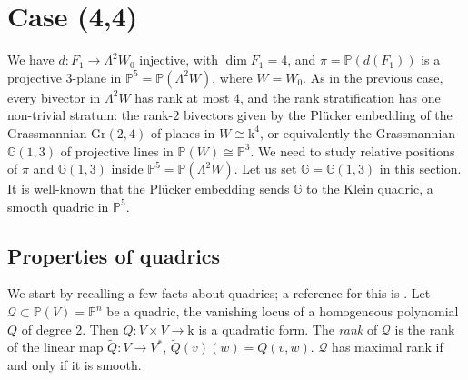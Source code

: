 \documentclass[10pt,reqno]{amsart}
\newcommand{\cQ}{\mathcal{Q}}
\newcommand{\GG}{\mathbb{G}}
\newcommand{\PP}{\mathbb P}
\renewcommand{\L}{\Lambda}
\newcommand{\kk}{\mathrm{k}}
\newcommand{\tr}[1]{\textrm{#1}}
\theoremstyle{definition}
\begin{document}



\section{Case (4,4)}\label{sec:(4,4)}

\noindent We have $d\colon F_1 \to \L^2 W_0$ injective, with $\dim F_1=4$, and $\pi=\PP(d(F_1))$ is a projective $3$-plane in $\PP^5=\PP(\L^2 W)$, where $W=W_0$. As in the previous case, every bivector in $\L^2 W$ has rank at most $4$, and the rank stratification has one non-trivial stratum: the rank-$2$ bivectors given by the Plücker embedding of the Grassmannian $\tr{Gr}(2,4)$ of planes in $W \cong \kk^4$, or equivalently the Grassmannian $\GG(1,3)$ of projective lines in $\PP(W) \cong \PP^3$. We need to study relative positions of $\pi$ and $\GG(1,3)$ inside $\PP^5=\PP(\L^2 W)$. Let us set $\GG=\GG(1,3)$ in this section. It is well-known that the Plücker embedding sends $\GG$ to the Klein quadric, a smooth quadric in $\PP^5$. 

\subsection{Properties of quadrics} We start by recalling a few facts about quadrics; a reference for this is \cite[Chapter 22]{Harris}. Let $\cQ\subset\PP(V)=\PP^n
$ be a quadric, the vanishing locus of a homogeneous polynomial $Q$ of degree 2. Then $Q\colon V\times V\to\kk$ is a quadratic form. The {\em rank} of $\cQ$ is the rank of the linear map $\tilde{Q}\colon V\to V^*$, $\tilde{Q}(v)(w)=Q(v,w)$. $\cQ$ has maximal rank if and only if it is smooth.
\end{document}
